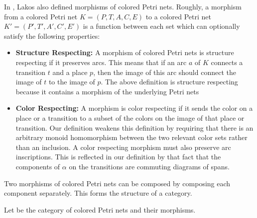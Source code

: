 In \cite{lakosabstraction}, Lakos also defined morphisms of colored Petri nets. Roughly, a morphism from a colored Petri net $K=(P, T, A, C, E)$ to a colored Petri net $K'=(P', T', A', C', E')$ is a function between each set which can optionally satisfy the following properties:
\begin{itemize}
    \item {\bf Structure Respecting:} A morphism of colored Petri nets is structure respecting if it preserves arcs. This means that if an arc $a$ of $K$ connects a transition $t$ and a place $p$, then the image of this arc should connect the image of $t$ to the image of $p$. The above definition is structure respecting because it contains a morphism of the underlying Petri nets
    \item {\bf Color Respecting:} A morphism is color respecting if it sends the color on a place or a transition to a subset of the colors on the image of that place or transition. Our definition weakens this definition by requiring that there is an arbitrary monoid homomorphism between the two relevant color sets rather than an inclusion. A color respecting morphism must also preserve arc inscriptions. This is reflected in our definition by that fact that the components of $\alpha$ on the transitions are commuting diagrams of spans.
\end{itemize}
Two morphisms of colored Petri nets can be composed by composing each component separately. This forms the structure of a category.
\begin{defn}
Let  be the category of colored Petri nets and their morphisms.
\end{defn}



